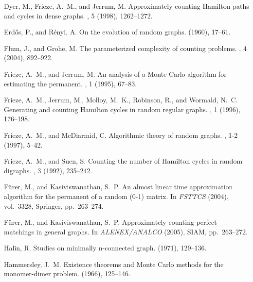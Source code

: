 \documentclass[11pt]{article}
\begin{document}
\begin{thebibliography}{10}
{\sc Dyer, M., Frieze, A.~M., and Jerrum, M.}
\newblock Approximately counting {Hamilton} paths and cycles in dense graphs.
, 5 (1998), 1262--1272.

{\sc Erd{\H{o}}s, P., and R{\'e}nyi, A.}
\newblock On the evolution of random graphs.
 (1960), 17--61.

{\sc Flum, J., and Grohe, M.}
\newblock The parameterized complexity of counting problems.
, 4 (2004), 892--922.

{\sc Frieze, A.~M., and Jerrum, M.}
\newblock An analysis of a {M}onte {C}arlo algorithm for estimating the
  permanent.
, 1 (1995), 67--83.

{\sc Frieze, A.~M., Jerrum, M., Molloy, M.~K., Robinson, R., and Wormald,
  N.~C.}
\newblock Generating and counting {H}amilton cycles in random regular graphs.
, 1 (1996), 176--198.

{\sc Frieze, A.~M., and McDiarmid, C.}
\newblock Algorithmic theory of random graphs.
, 1-2 (1997), 5--42.

{\sc Frieze, A.~M., and Suen, S.}
\newblock Counting the number of {H}amilton cycles in random digraphs.
, 3 (1992), 235--242.

{\sc F{\"u}rer, M., and Kasiviswanathan, S.~P.}
\newblock An almost linear time approximation algorithm for the permanent of a
  random (0-1) matrix.
\newblock In {\em FSTTCS\/} (2004), vol.~3328, Springer, pp.~263--274.

{\sc F{\"u}rer, M., and Kasiviswanathan, S.~P.}
\newblock Approximately counting perfect matchings in general graphs.
\newblock In {\em ALENEX/ANALCO\/} (2005), SIAM, pp.~263--272.

{\sc Halin, R.}
\newblock Studies on minimally n-connected graph.
 (1971), 129--136.

{\sc Hammersley, J.~M.}
\newblock Existence theorems and {M}onte {C}arlo methods for the monomer-dimer
  problem.
 (1966), 125--146.


\end{thebibliography}
\end{document}
